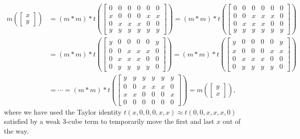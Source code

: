 \begin{rem}
\begin{align*}
m\left(\begin{bmatrix} x\\ y \end{bmatrix}\right) &= (m*m)*t\left(\begin{bmatrix} 0 & 0 & 0 & 0 & 0 & 0 \\ x & 0 & 0 & 0 & x & x \\ 0 & x & x & x & 0 & 0 \\ y & y & y & y & y & y\end{bmatrix}\right) = (m*m)*t\left(\begin{bmatrix} 0 & 0 & 0 & 0 & 0 & 0 \\ 0 & 0 & x & x & x & 0 \\ 0 & x & x & x & 0 & 0 \\ y & y & y & y & y & y\end{bmatrix}\right)\\
&= (m*m)*t\left(\begin{bmatrix} y & 0 & 0 & 0 & 0 & y \\ 0 & 0 & x & x & x & 0 \\ 0 & x & x & x & 0 & 0 \\ 0 & y & y & y & y & 0\end{bmatrix}\right) = (m*m)*t\left(\begin{bmatrix} y & 0 & 0 & 0 & 0 & y \\ x & 0 & 0 & 0 & x & x \\ 0 & x & x & x & 0 & 0 \\ 0 & y & y & y & y & 0\end{bmatrix}\right)\\
&= \cdots = (m*m)*t\left(\begin{bmatrix} y & y & y & y & y & y \\ 0 & 0 & x & x & x & 0 \\ x & x & 0 & 0 & 0 & x \\ 0 & 0 & 0 & 0 & 0 & 0\end{bmatrix}\right) = m\left(\begin{bmatrix} y\\ x \end{bmatrix}\right),
\end{align*}
where we have used the Taylor identity $t(x,0,0,0,x,x) \approx t(0,0,x,x,x,0)$ satisfied by a weak 3-cube term to temporarily move the first and last $x$ out of the way.
\end{rem}


